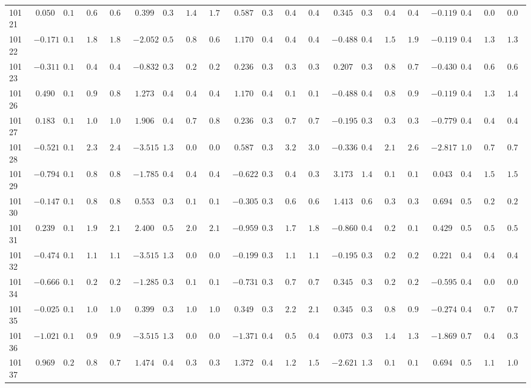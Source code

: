 \begin{landscape}
{\begin{longtable}{l|rrrr|rrrr|rrrr|rrrr|rrrr}
10121&$ 0.050$&$0.161$&$0.661$&$0.694$&$ 0.399$&$0.382$&$1.481$&$1.713$&$ 0.587$&$0.361$&$0.402$&$0.425$&$ 0.345$&$0.396$&$0.487$&$0.452$&$-0.119$&$0.426$&$0.017$&$0.017$\tabularnewline
10122&$-0.171$&$0.155$&$1.833$&$1.867$&$-2.052$&$0.572$&$0.878$&$0.690$&$ 1.170$&$0.443$&$0.441$&$0.480$&$-0.488$&$0.420$&$1.565$&$1.940$&$-0.119$&$0.426$&$1.391$&$1.366$\tabularnewline
10123&$-0.311$&$0.154$&$0.497$&$0.495$&$-0.832$&$0.330$&$0.240$&$0.260$&$ 0.236$&$0.340$&$0.375$&$0.387$&$ 0.207$&$0.387$&$0.821$&$0.793$&$-0.430$&$0.428$&$0.672$&$0.685$\tabularnewline
10126&$ 0.490$&$0.188$&$0.917$&$0.803$&$ 1.273$&$0.443$&$0.452$&$0.457$&$ 1.170$&$0.443$&$0.156$&$0.122$&$-0.488$&$0.420$&$0.854$&$0.996$&$-0.119$&$0.426$&$1.376$&$1.400$\tabularnewline
10127&$ 0.183$&$0.167$&$1.085$&$1.042$&$ 1.906$&$0.483$&$0.740$&$0.808$&$ 0.236$&$0.340$&$0.780$&$0.781$&$-0.195$&$0.390$&$0.330$&$0.359$&$-0.779$&$0.473$&$0.434$&$0.443$\tabularnewline
10128&$-0.521$&$0.155$&$2.364$&$2.405$&$-3.515$&$1.347$&$0.087$&$0.096$&$ 0.587$&$0.361$&$3.270$&$3.014$&$-0.336$&$0.401$&$2.149$&$2.637$&$-2.817$&$1.034$&$0.766$&$0.763$\tabularnewline
10129&$-0.794$&$0.164$&$0.817$&$0.850$&$-1.785$&$0.486$&$0.427$&$0.471$&$-0.622$&$0.335$&$0.418$&$0.391$&$ 3.173$&$1.487$&$0.122$&$0.133$&$ 0.043$&$0.438$&$1.521$&$1.516$\tabularnewline
10130&$-0.147$&$0.155$&$0.870$&$0.817$&$ 0.553$&$0.395$&$0.119$&$0.119$&$-0.305$&$0.330$&$0.676$&$0.674$&$ 1.413$&$0.633$&$0.328$&$0.321$&$ 0.694$&$0.577$&$0.282$&$0.288$\tabularnewline
10131&$ 0.239$&$0.170$&$1.986$&$2.120$&$ 2.400$&$0.530$&$2.083$&$2.163$&$-0.959$&$0.358$&$1.745$&$1.866$&$-0.860$&$0.496$&$0.247$&$0.199$&$ 0.429$&$0.504$&$0.534$&$0.572$\tabularnewline
10132&$-0.474$&$0.154$&$1.148$&$1.144$&$-3.515$&$1.347$&$0.087$&$0.096$&$-0.199$&$0.330$&$1.129$&$1.136$&$-0.195$&$0.390$&$0.252$&$0.298$&$ 0.221$&$0.462$&$0.454$&$0.421$\tabularnewline
10134&$-0.666$&$0.159$&$0.281$&$0.298$&$-1.285$&$0.375$&$0.139$&$0.130$&$-0.731$&$0.340$&$0.743$&$0.778$&$ 0.345$&$0.396$&$0.232$&$0.232$&$-0.595$&$0.444$&$0.020$&$0.021$\tabularnewline
10135&$-0.025$&$0.159$&$1.089$&$1.052$&$ 0.399$&$0.382$&$1.010$&$1.099$&$ 0.349$&$0.345$&$2.289$&$2.180$&$ 0.345$&$0.396$&$0.861$&$0.901$&$-0.274$&$0.422$&$0.757$&$0.757$\tabularnewline
10136&$-1.021$&$0.178$&$0.958$&$0.997$&$-3.515$&$1.347$&$0.087$&$0.096$&$-1.371$&$0.418$&$0.510$&$0.401$&$ 0.073$&$0.383$&$1.402$&$1.309$&$-1.869$&$0.792$&$0.419$&$0.393$\tabularnewline
10137&$ 0.969$&$0.240$&$0.854$&$0.798$&$ 1.474$&$0.455$&$0.324$&$0.317$&$ 1.372$&$0.492$&$1.290$&$1.524$&$-2.621$&$1.373$&$0.129$&$0.145$&$ 0.694$&$0.577$&$1.150$&$1.098$\tabularnewline

\end{longtable}}
\end{landscape}
